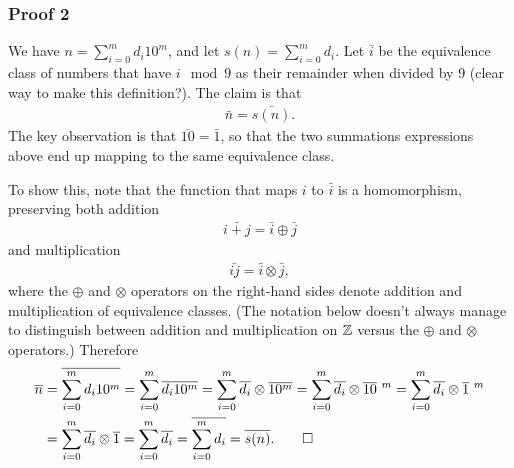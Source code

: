 \documentclass[12pt]{article}
\begin{document}
\subsubsection*{Proof 2}
\begin{mdframed}
  We have $n = \sum_{i=0}^m d_i 10^m$, and let $s(n) = \sum_{i=0}^m d_i$. Let
  $\bar{i}$ be the equivalence class of numbers that have $i \mod 9$ as their
  remainder when divided by 9 (clear way to make this definition?). The claim
  is that
  \begin{align*}
  \bar n = \bar{s(n)}.
  \end{align*}
  The key observation is that $\bar {10} = \bar 1$, so that the two summations
  expressions above end up mapping to the same equivalence class.

  To show this, note that the function that maps $i$ to $\bar i$ is a
  homomorphism, preserving both addition
  \begin{align*}
  \bar{i + j} = \bar i \oplus \bar j
  \end{align*}
  and multiplication
  \begin{align*}
  \bar{ij} = \bar i \otimes \bar j,
  \end{align*}
  where the $\oplus$ and $\otimes$ operators on the right-hand sides denote
  addition and multiplication of equivalence classes. (The notation below
  doesn't always manage to distinguish between addition and multiplication on
  $\Z$ versus the $\oplus$ and $\otimes$ operators.)  Therefore
  \begin{align*}
    \bar n &= \bar{\sum_{i=0}^m d_i 10^m}
           = \sum_{i=0}^m \bar{d_i 10^m}
           = \sum_{i=0}^m \bar{d_i} \otimes \bar{10^m}
           = \sum_{i=0}^m \bar{d_i} \otimes \bar{10}~^m
           = \sum_{i=0}^m \bar{d_i} \otimes \bar{1}~^m\\
           &= \sum_{i=0}^m \bar{d_i} \otimes \bar{1}
           = \sum_{i=0}^m \bar{d_i}
           = \bar{\sum_{i=0}^m d_i} = \bar{s(n)}. \qed\\
  \end{align*}
\end{mdframed}
\end{document}
